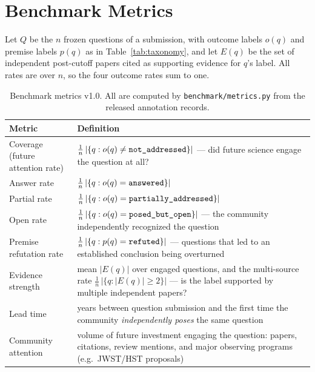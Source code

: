 \section{Benchmark Metrics}
\label{sec:metrics}

Let $Q$ be the $n$ frozen questions of a submission, with outcome labels
$o(q)$ and premise labels $p(q)$ as in Table~\ref{tab:taxonomy}, and let
$E(q)$ be the set of independent post-cutoff papers cited as supporting
evidence for $q$'s label. All rates are over $n$, so the four outcome
rates sum to one.

\begin{table}[t]
  \centering
  \small
  \caption{Benchmark metrics v1.0. All are computed by
  \texttt{benchmark/metrics.py} from the released annotation records.}
  \label{tab:metrics}
  \begin{tabular}{@{}lp{9.6cm}@{}}
    \toprule
    Metric & Definition \\
    \midrule
    Coverage (future attention rate) &
      $\frac{1}{n}\,|\{q : o(q) \neq \texttt{not\_addressed}\}|$ ---
      did future science engage the question at all? \\
    Answer rate &
      $\frac{1}{n}\,|\{q : o(q) = \texttt{answered}\}|$ \\
    Partial rate &
      $\frac{1}{n}\,|\{q : o(q) = \texttt{partially\_addressed}\}|$ \\
    Open rate &
      $\frac{1}{n}\,|\{q : o(q) = \texttt{posed\_but\_open}\}|$ ---
      the community independently recognized the question \\
    Premise refutation rate &
      $\frac{1}{n}\,|\{q : p(q) = \texttt{refuted}\}|$ ---
      questions that led to an established conclusion being overturned \\
    Evidence strength &
      mean $|E(q)|$ over engaged questions, and the multi-source rate
      $\frac{1}{n}\,|\{q : |E(q)| \geq 2\}|$ --- is the label supported
      by multiple independent papers? \\
    Lead time &
      years between question submission and the first time the community
      \emph{independently poses} the same question \\
    Community attention &
      volume of future investment engaging the question: papers,
      citations, review mentions, and major observing programs (e.g.\
      JWST/HST proposals) \\
    \bottomrule
  \end{tabular}
\end{table}

